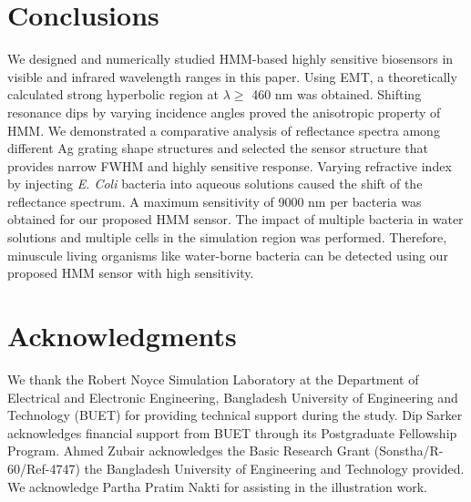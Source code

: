 \documentclass[conference]{IEEEtran}
\begin{document}
\section{Conclusions}
We designed and numerically studied HMM-based highly sensitive biosensors in visible and infrared wavelength ranges in this paper. Using EMT, a theoretically calculated strong hyperbolic region at $\lambda \geq$ 460 nm was obtained. Shifting resonance dips by varying incidence angles proved the anisotropic property of HMM. We demonstrated a comparative analysis of reflectance spectra among different Ag grating shape structures and selected the sensor structure that provides narrow FWHM and highly sensitive response. Varying refractive index by injecting \textit{E. Coli} bacteria into aqueous solutions caused the shift of the reflectance spectrum. A maximum sensitivity of 9000 nm per bacteria was obtained for our proposed HMM sensor. The impact of multiple bacteria in water solutions and multiple cells in the simulation region was performed. Therefore, minuscule living organisms like water-borne bacteria can be detected using our proposed HMM sensor with high sensitivity.
\section*{Acknowledgments}
We thank the Robert Noyce Simulation Laboratory at the Department of Electrical and Electronic Engineering, Bangladesh University of Engineering and Technology (BUET) for providing technical support during the study. Dip Sarker acknowledges financial support from BUET through its Postgraduate Fellowship Program. Ahmed Zubair acknowledges the Basic Research Grant (Sonstha/R-60/Ref-4747) the Bangladesh University of Engineering and Technology provided. We acknowledge Partha Pratim Nakti for assisting in the illustration work.
\end{document}
